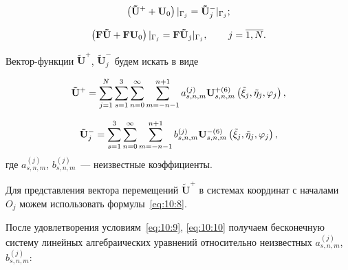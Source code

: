 \begin{equation}
\left( {{{{\bf{\tilde U}}}^ + } + {{\bf{U}}_0}} \right){|_{{\Gamma _j}}} = {\bf{\tilde U}}_j^ - {|_{{\Gamma _j}}};
\label{eq:10:9}
\end{equation}

\begin{equation}
\left( {{\bf{F\tilde U}} + {\bf{F}}{{\bf{U}}_0}} \right){|_{{\Gamma _j}}} = {\bf{F}}{{\bf{\tilde U}}_j}{|_{{\Gamma _j}}},\qquad {\kern 1pt} j = \overline {1,N}.
\label{eq:10:10}
\end{equation}

Вектор-функции $\mathbf{\tilde U}^+$, $\mathbf{\tilde U}_j^-$ будем искать в виде

\begin{equation}
{{\bf{\tilde U}}^ + } = \mathop \sum \limits_{j = 1}^N \sum\limits_{s = 1}^3 {\sum\limits_{n = 0}^\infty  {\sum\limits_{m =  - n - 1}^{n + 1} {a_{s,n,m}^{(j)}} } } {\bf{U}}_{s,n,m}^{ + (6)}\left( {{{\tilde \xi }_j},{{\tilde \eta }_j},{\varphi _j}} \right),
\end{equation}

\begin{equation}
{\bf{\tilde U}}_j^ -  = \sum\limits_{s = 1}^3 {\sum\limits_{n = 0}^\infty  {\sum\limits_{m =  - n - 1}^{n + 1} {b_{s,n,m}^{(j)}} } } {\bf{U}}_{s,n,m}^{ - (6)}\left( {{{\tilde \xi }_j},{{\tilde \eta }_j},{\varphi _j}} \right),
\end{equation}
где $a_{s,n,m}^{(j)}$, $b_{s,n,m}^{(j)}$~--- неизвестные коэффициенты.

Для представления вектора перемещений $\mathbf{\tilde U}^+$ в системах координат с началами $O_j$ можем использовать формулы~\eqref{eq:10:8}.

После удовлетворения условиям~\eqref{eq:10:9}, \eqref{eq:10:10} получаем бесконечную систему линейных алгебраических уравнений относительно неизвестных $a_{s,n,m}^{(j)}$, $b_{s,n,m}^{(j)}$:

